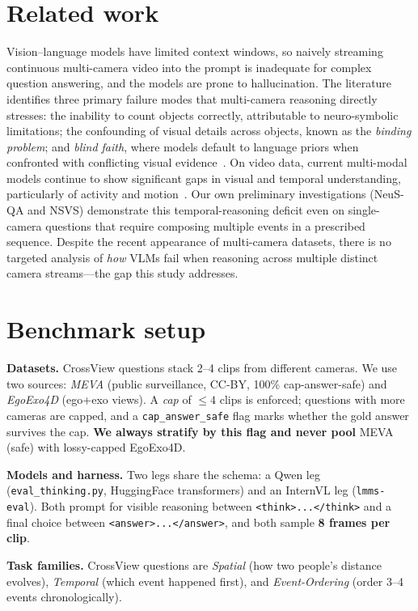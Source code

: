 \documentclass[11pt]{article}
\begin{document}
\section{Related work}
Vision--language models have limited context windows, so naively streaming continuous
multi-camera video into the prompt is inadequate for complex question answering, and the models are
prone to hallucination. The literature identifies three primary failure modes that multi-camera
reasoning directly stresses: the inability to count objects correctly, attributable to
neuro-symbolic limitations; the confounding of visual details across objects, known as the
\emph{binding problem}; and \emph{blind faith}, where models default to language priors when
confronted with conflicting visual evidence~\cite{ref1,ref2,ref3,ref4}. On video data, current
multi-modal models continue to show significant gaps in visual and temporal understanding,
particularly of activity and motion~\cite{ref5}. Our own preliminary investigations (NeuS-QA and
NSVS) demonstrate this temporal-reasoning deficit even on single-camera questions that require
composing multiple events in a prescribed sequence. Despite the recent appearance of multi-camera
datasets, there is no targeted analysis of \emph{how} VLMs fail when reasoning across multiple
distinct camera streams---the gap this study addresses.

\section{Benchmark setup}
\textbf{Datasets.} CrossView questions stack 2--4 clips from different cameras. We use two sources:
\emph{MEVA} (public surveillance, CC-BY, 100\% cap-answer-safe) and \emph{EgoExo4D}
(ego+exo views). A \emph{cap} of $\le 4$ clips is enforced; questions with more cameras are capped,
and a \texttt{cap\_answer\_safe} flag marks whether the gold answer survives the cap. \textbf{We
always stratify by this flag and never pool} MEVA (safe) with lossy-capped EgoExo4D.

\textbf{Models and harness.} Two legs share the schema: a Qwen leg
(\texttt{eval\_thinking.py}, HuggingFace transformers) and an InternVL leg (\texttt{lmms-eval}).
Both prompt for visible reasoning between \texttt{<think>...</think>} and a final choice between
\texttt{<answer>...</answer>}, and both sample \textbf{8 frames per clip}.

\textbf{Task families.} CrossView questions are \emph{Spatial} (how two people's distance evolves),
\emph{Temporal} (which event happened first), and \emph{Event-Ordering} (order 3--4 events
chronologically).
\end{document}
